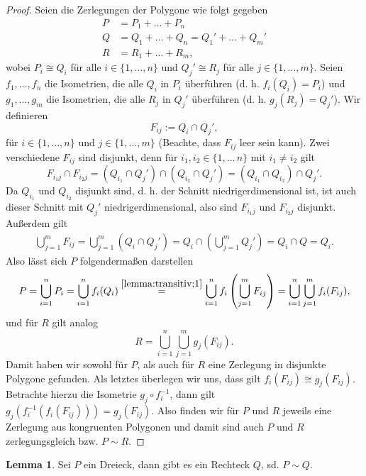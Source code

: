 \documentclass[11pt,titlepage]{article}
\theoremstyle{definition}
\newtheorem{lemma}[theorem]{Lemma}
\theoremstyle{remark}
\begin{document}
	\begin{proof}
		Seien die Zerlegungen der Polygone wie folgt gegeben
		\begin{align*}
			P &= P_1+\ldots+P_n \\
			Q &= Q_1+\ldots+Q_n = Q_1'+\ldots+Q_m' \\
			R &= R_1+\ldots+R_m,
		\end{align*}
		wobei $P_i\cong Q_i$ für alle $i\in\{1,\ldots,n\}$ und $Q_j'\cong R_j$ für alle $j\in\{1,\ldots,m\}$. 
		Seien $f_1,\ldots,f_n$ die Isometrien, die alle $Q_i$ in $P_i$ überführen (d. h. $f_i(Q_i)=P_i$) und 
		$g_1,\ldots,g_m$ die Isometrien, die alle $R_j$ in $Q_j'$ überführen (d. h. $g_j(R_j)=Q_j'$).
		Wir definieren
		\[ F_{ij}:=Q_i\cap Q_j',\]
		für $i\in\{1,\ldots,n\}$ und $j\in\{1,\ldots,m\}$ (Beachte, dass $F_{ij}$ leer sein kann). Zwei verschiedene 
		$F_{ij}$ sind disjunkt, denn für $i_1,i_2\in\{1,\ldots\,n\}$ mit $i_1\neq i_2$ gilt 
		\[F_{i_1 j}\cap F_{i_2 j}=(Q_{i_1}\cap Q_j')\cap(Q_{i_2}\cap Q_j')=(Q_{i_1}\cap Q_{i_2})\cap Q_j'.\] 
		Da $Q_{i_1}$ und $Q_{i_2}$ disjunkt sind, d. h. der Schnitt niedrigerdimensional ist, ist 
		auch dieser Schnitt mit $Q_j'$ niedrigerdimensional, also sind $F_{i_1j}$ und $F_{i_2j}$ disjunkt. Außerdem gilt
		\begin{align}
			\bigcup_{j=1}^m F_{ij} = \bigcup_{j=1}^m \left( Q_i \cap Q_j' \right) = 
			Q_i \cap \left( \bigcup_{j=1}^m Q_j' \right)=Q_i \cap Q = Q_i. \label{lemma:transitiv;1}
		\end{align}
		Also lässt sich $P$ folgendermaßen darstellen
		\[ P=\bigcup_{i=1}^n P_i = \bigcup_{i=1}^n f_i(Q_i) \overset{\ref{lemma:transitiv;1}}{=}\bigcup_{i=1}^n f_i 
		\left(\bigcup_{j=1}^m F_{ij} \right) =
		\bigcup_{i=1}^n \bigcup_{j=1}^m f_i(F_{ij}), \]
		und für $R$ gilt analog
		\[ R=\bigcup_{i=1}^n \bigcup_{j=1}^m g_j(F_{ij}). \]
		Damit haben wir sowohl für $P$, als auch für $R$ eine Zerlegung in disjunkte Polygone 
		gefunden. Als letztes überlegen wir uns, dass gilt $f_i(F_{ij})\cong g_j(F_{ij})$. Betrachte hierzu die Isometrie 
		$g_j\circ f_i^{-1}$, dann gilt $g_j(f_i^{-1}(f_i(F_{ij})))=g_j(F_{ij})$. Also finden wir für $P$ und $R$ jeweils eine 
		Zerlegung aus kongruenten Polygonen und damit sind auch $P$ und $R$ zerlegungsgleich bzw. $P\sim R$.
	\end{proof}
	
	\begin{lemma}
		Sei $P$ ein Dreieck, dann gibt es ein Rechteck $Q$, sd. $P\sim Q$. \label{lemma:dreieck,rechteck}
	\end{lemma}
	
\end{document}

